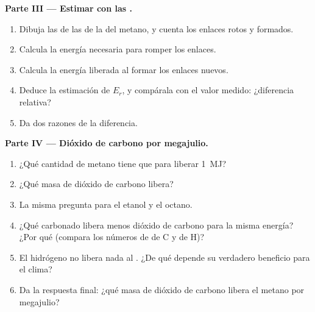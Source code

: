 \begin{problem}
\medskip
\noindent\textbf{Parte III --- Estimar con las .}
\begin{enumerate}[resume]
  \item Dibuja las  de las  de la
         del metano, y cuenta los enlaces rotos y formados.
  \item Calcula la energía necesaria para romper los enlaces.
  \item Calcula la energía liberada al formar los enlaces nuevos.
  \item Deduce la estimación de $E_r$, y compárala con el valor medido:
        ¿diferencia relativa?
  \item Da dos razones de la diferencia.
\end{enumerate}

\medskip
\noindent\textbf{Parte IV --- Dióxido de carbono por megajulio.}
\begin{enumerate}[resume]
  \item ¿Qué cantidad de metano tiene que  para liberar \qty{1}{MJ}?
  \item ¿Qué masa de dióxido de carbono libera?
  \item La misma pregunta para el etanol y el octano.
  \item ¿Qué  carbonado libera menos dióxido de carbono para la
        misma energía? ¿Por qué (compara los números de  de C y de
        H)?
  \item El hidrógeno no libera nada al . ¿De qué depende su
        verdadero beneficio para el clima?
  \item Da la respuesta final: ¿qué masa de dióxido de carbono libera el
        metano por megajulio?
\end{enumerate}
\end{problem}
